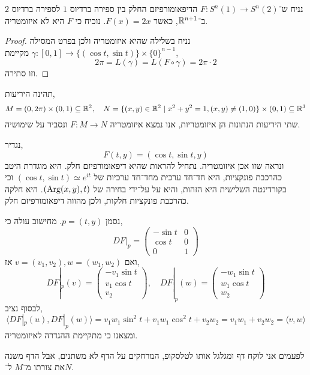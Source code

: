 \subquestion{}
נניח ש־$F : S^n(1) \to S^n(2)$ הדיפאומורפיזם החלק בין ספירה ברדיוס $1$ לספירה ברדיוס $2$ ב־$\mathbb{R}^{n + 1}$, כאשר $F(x) = 2x$.
נוכיח כי $F$ היא לא איזומטריה.
\begin{proof}
	נניח בשלילה שהיא איזומטריה ולכן בפרט המסילה $\gamma : [0, 1] \to \{ (\cos t, \sin t) \} \times {\{ 0 \}}^{n - 1}$ מקיימת,
	\[
		2 \pi
		= L(\gamma)
		= L(F \circ \gamma)
		= 2 \pi \cdot 2
	\]
	וזו סתירה.
\end{proof}

\subquestion{}
תהינה היריעות,
\[
	M = (0, 2 \pi) \times (0, 1) \subseteq \mathbb{R}^2,
	\quad
	N = \{ (x, y) \in \mathbb{R}^2 \mid x^2 + y^2 = 1, (x, y) \ne (1, 0) \} \times (0, 1) \subseteq \mathbb{R}^3
\]
שתי היריעות הנתונות הן איזומטריות, אנו נמצא איזומטריה $F : M \to N$ ונסביר על שימושיה.
\begin{solution}
	נגדיר,
	\[
		F(t, y)
		= (\cos t, \sin t, y)
	\]
	ונראה שזו אכן איזומטריה.
	נתחיל להראות שהיא דיפאומורפיזם חלק.
	היא מוגדרת היטב כהרכבת פונקציות, היא חד־חד ערכית מחד־חד ערכיות של $(\cos t, \sin t) \simeq e^{it}$ וכי בקורדינטה השלישית היא הזהות, והיא על על־ידי בחירה של $(\operatorname{Arg} (x, y), t)$.
	היא חלקה כהרכבת פונקציות חלקות, ולכן מהווה דיפאומורפיזם חלק.

	נסמן $p = (t, y)$.
	מחישוב עולה כי,
	\[
		D F |_p
		= \begin{pmatrix}
			- \sin t & 0 \\
			\cos t & 0 \\
			0 & 1
		\end{pmatrix} 
	\]
	ואם $v = (v_1, v_2), w = (w_1, w_2)$ אז,
	\[
		D F |_{p}(v)
		= \begin{pmatrix} - v_1 \sin t \\ v_1 \cos t \\ v_2 \end{pmatrix},
		\quad
		D F |_{p}(w)
		= \begin{pmatrix} - w_1 \sin t \\ w_1 \cos t \\ w_2 \end{pmatrix}
	\]
	לבסוף נציב,
	\[
		\langle D F |_p(u), D F |_p(w) \rangle
		= v_1 w_1 \sin^2 t + v_1 w_1 \cos^2 t + v_2 w_2
		= v_1 w_1 + v_2 w_2
		= \langle v, w \rangle
	\]
	ומצאנו כי מתקיימת ההגדרה לאיזומטריה.

	לפעמים אני לוקח דף ומגלגל אותו לטלסקופ, המרחקים על הדף לא משתנים, אבל הדף משנה את צורתו מ־$M$ ל־$N$.
\end{solution}

